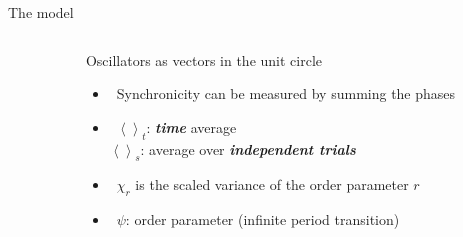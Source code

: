 \documentclass[serif,mathserif]{beamer}
\begin{document}
\begin{frame}{The model}
    \begin{columns}
        \begin{column}{0.4\textwidth}
        \end{column}
        \begin{column}{0.6\textwidth}
            Oscillators as vectors in the unit circle
            \begin{itemize}
                \vspace{0.25cm}
                \item \ \pause Synchronicity can be measured by summing the phases
                \vspace{0.25cm}
                \item \ \pause $\left< \right>_t$: \textit{\textbf{time}} average\\
                    \hspace{0.1cm}$\left< \right>_s$: average over \textit{\textbf{independent trials}}
                \vspace{0.25cm}
                \item \ \pause $\chi_r$ is the scaled variance of the order parameter $r$
                \vspace{0.25cm}
                \item \ \pause $\psi$: order parameter (infinite period transition)
            \end{itemize}
        \end{column}
    \end{columns}
\end{frame}
\end{document}
